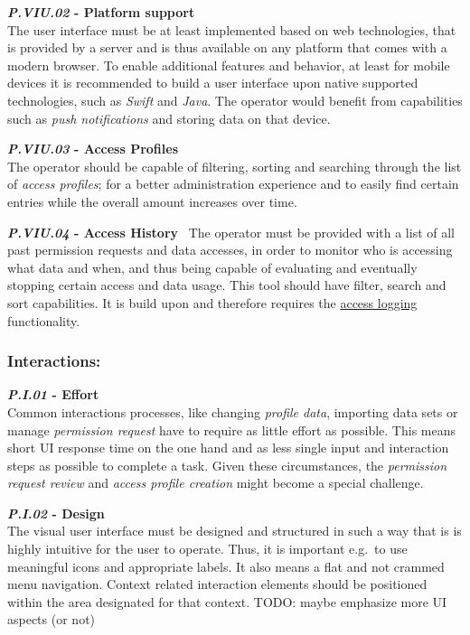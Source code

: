 \documentclass[12pt,english,a4paper,titlepage,cleardoublepage=empty,dottedtoc]{report}
\begin{document}
\textbf{\emph{\protect\hypertarget{pviu02}{}{P.VIU.02}} - Platform
support}\\
The user interface must be at least implemented based on web
technologies, that is provided by a server and is thus available on any
platform that comes with a modern browser. To enable additional features
and behavior, at least for mobile devices it is recommended to build a
user interface upon native supported technologies, such as \emph{Swift}
and \emph{Java}. The operator would benefit from capabilities such as
\emph{push notifications} and storing data on that device.

\textbf{\emph{\protect\hypertarget{pviu03}{}{P.VIU.03}} - Access
Profiles}\\
The operator should be capable of filtering, sorting and searching
through the list of \emph{access profiles}; for a better administration
experience and to easily find certain entries while the overall amount
increases over time.

\textbf{\emph{\protect\hypertarget{pviu04}{}{P.VIU.04}} - Access
History}~ The operator must be provided with a list of all past
permission requests and data accesses, in order to monitor who is
accessing what data and when, and thus being capable of evaluating and
eventually stopping certain access and data usage. This tool should have
filter, search and sort capabilities. It is build upon and therefore
requires the \protect\hyperlink{pb01}{access logging} functionality.

\subsubsection{Interactions:}\label{interactions}

\textbf{\emph{\protect\hypertarget{pi01}{}{P.I.01}} - Effort}\\
Common interactions processes, like changing \emph{profile data},
importing data sets or manage \emph{permission request} have to require
as little effort as possible. This means short UI response time on the
one hand and as less single input and interaction steps as possible to
complete a task. Given these circumstances, the \emph{permission request
review} and \emph{access profile creation} might become a special
challenge.

\textbf{\emph{\protect\hypertarget{pi02}{}{P.I.02}} - Design}\\
The visual user interface must be designed and structured in such a way
that is is highly intuitive for the user to operate. Thus, it is
important e.g.~to use meaningful icons and appropriate labels. It also
means a flat and not crammed menu navigation. Context related
interaction elements should be positioned within the area designated for
that context. TODO: maybe emphasize more UI aspects (or not)
\end{document}
